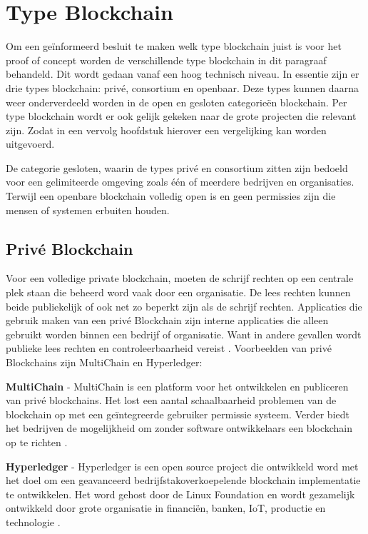 \section{Type Blockchain}
Om een geïnformeerd besluit te maken welk type blockchain juist is voor het proof of concept worden de verschillende type blockchain in dit paragraaf behandeld. Dit wordt gedaan vanaf een hoog technisch niveau. In essentie zijn er drie types blockchain: privé, consortium en openbaar. Deze types kunnen daarna weer onderverdeeld worden in de open en gesloten categorieën blockchain. Per type blockchain wordt er ook gelijk gekeken naar de grote projecten die relevant zijn. Zodat in een vervolg hoofdstuk hierover een vergelijking kan worden uitgevoerd.\par

De categorie gesloten, waarin de types privé en consortium zitten zijn bedoeld voor een gelimiteerde omgeving zoals één of meerdere bedrijven en organisaties. Terwijl een openbare blockchain volledig open is en geen permissies zijn die mensen of systemen erbuiten houden.

\subsection{Privé Blockchain}
Voor een volledige private blockchain, moeten de schrijf rechten op een centrale plek staan die beheerd word vaak door een organisatie. De lees rechten kunnen beide publiekelijk of ook net zo beperkt zijn als de schrijf rechten. Applicaties die gebruik maken van een privé Blockchain zijn interne applicaties die alleen gebruikt worden binnen een bedrijf of organisatie. Want in andere gevallen wordt publieke lees rechten en controleerbaarheid vereist \cite{privateBlockChains}. Voorbeelden van privé Blockchains zijn MultiChain en Hyperledger:

\textbf{MultiChain} - MultiChain is een platform voor het ontwikkelen en publiceren van privé blockchains. Het lost een aantal schaalbaarheid problemen \cite{oreillyScalability} van de blockchain op met een geïntegreerde gebruiker permissie systeem. Verder biedt het bedrijven de mogelijkheid om zonder software ontwikkelaars een blockchain op te richten \cite{mutlichain}.

\textbf{Hyperledger} - Hyperledger is een open source project die ontwikkeld word met het doel om een geavanceerd bedrijfstakoverkoepelende blockchain implementatie te ontwikkelen. Het word gehost door de Linux Foundation \cite{linuxFoundation} en wordt gezamelijk ontwikkeld door grote organisatie in financiën, banken, IoT, productie en technologie \cite{hyperledger}. 

